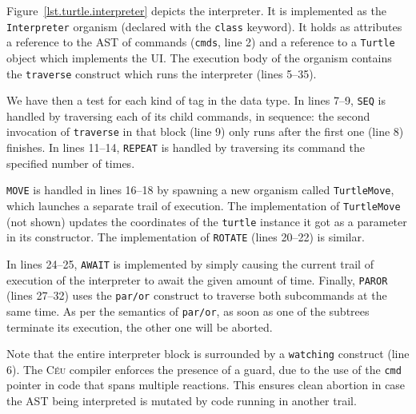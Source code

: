 \documentclass{acm_proc_article-sp}
\newcommand{\CEU}{\textsc{C\'{e}u}\xspace}
\newcommand{\code}[1] {{\small{\texttt{#1}}}}
\begin{document}
Figure~\ref{lst.turtle.interpreter} depicts the interpreter. It is implemented
as the \code{Interpreter} organism (declared with the \code{class} keyword).
It holds as attributes a reference to the AST of commands (\code{cmds}, line 2)
and a reference to a \code{Turtle} object which implements the UI. The
execution body of the organism contains the \code{traverse} construct which
runs the interpreter (lines 5--35).

We have then a test for each kind of tag in the data type. In lines 7--9,
\code{SEQ} is handled by traversing each of its child commands, in sequence:
the second invocation of \code{traverse} in that block (line 9) only runs
after the first one (line 8) finishes. In lines 11--14, \code{REPEAT} is
handled by traversing its command the specified number of times.

\code{MOVE} is handled in lines 16--18 by spawning a new organism called
\code{TurtleMove}, which launches a separate trail of execution. The
implementation of \code{TurtleMove} (not shown) updates the coordinates of the
\code{turtle} instance it got as a parameter in its constructor. The
implementation of \code{ROTATE} (lines 20--22) is similar.

In lines 24--25, \code{AWAIT} is implemented by simply causing the current
trail of execution of the interpreter to await the given amount of time.
Finally, \code{PAROR} (lines 27--32) uses the \code{par/or} construct
to traverse both subcommands at the same time. As per the semantics of
\code{par/or}, as soon as one of the subtrees terminate its execution,
the other one will be aborted.

Note that the entire interpreter block is surrounded by a \code{watching}
construct (line 6). The \CEU compiler enforces the presence of a guard, 
due to the use of the \code{cmd} pointer in code that spans multiple
reactions. This ensures clean abortion in case the AST being interpreted
is mutated by code running in another trail.
\end{document}
